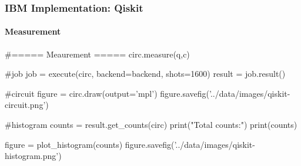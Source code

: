 \begin{frame}[fragile]{}
	\frametitle{IBM Implementation: Qiskit}
	\framesubtitle{Measurement}
	\vspace*{0.25cm}
	\begin{adjustbox}{max width=0.6\textwidth}
		\begin{python}
#===== Meaurement =====
circ.measure(q,c)

#job
job = execute(circ, backend=backend, shots=1600)
result = job.result()

#circuit
figure = circ.draw(output='mpl')
figure.savefig('../data/images/qiskit-circuit.png')

#histogram
counts = result.get_counts(circ)
print("Total counts:")
print(counts)

figure = plot_histogram(counts)
figure.savefig('../data/images/qiskit-histogram.png')
		\end{python}
	\end{adjustbox}
	
\end{frame}

